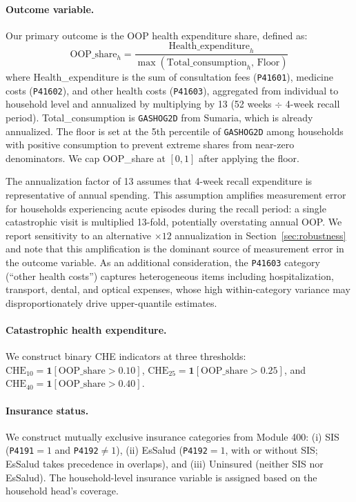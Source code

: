 \paragraph{Outcome variable.} Our primary outcome is the OOP health expenditure share, defined as:
\begin{equation}\label{eq:oop_share}
    \text{OOP\_share}_h = \frac{\text{Health\_expenditure}_h}{\max(\text{Total\_consumption}_h, \, \text{Floor})}
\end{equation}
where Health\_expenditure is the sum of consultation fees (\texttt{P41601}), medicine costs (\texttt{P41602}), and other health costs (\texttt{P41603}), aggregated from individual to household level and annualized by multiplying by 13 (52 weeks $\div$ 4-week recall period). Total\_consumption is \texttt{GASHOG2D} from Sumaria, which is already annualized. The floor is set at the 5th percentile of \texttt{GASHOG2D} among households with positive consumption to prevent extreme shares from near-zero denominators. We cap OOP\_share at $[0, 1]$ after applying the floor.

The annualization factor of 13 assumes that 4-week recall expenditure is representative of annual spending. This assumption amplifies measurement error for households experiencing acute episodes during the recall period: a single catastrophic visit is multiplied 13-fold, potentially overstating annual OOP. We report sensitivity to an alternative $\times 12$ annualization in Section~\ref{sec:robustness} and note that this amplification is the dominant source of measurement error in the outcome variable. As an additional consideration, the \texttt{P41603} category (``other health costs'') captures heterogeneous items including hospitalization, transport, dental, and optical expenses, whose high within-category variance may disproportionately drive upper-quantile estimates.

\paragraph{Catastrophic health expenditure.} We construct binary CHE indicators at three thresholds: $\text{CHE}_{10} = \mathbf{1}[\text{OOP\_share} > 0.10]$, $\text{CHE}_{25} = \mathbf{1}[\text{OOP\_share} > 0.25]$, and $\text{CHE}_{40} = \mathbf{1}[\text{OOP\_share} > 0.40]$.

\paragraph{Insurance status.} We construct mutually exclusive insurance categories from Module 400: (i) SIS (\texttt{P4191}$=1$ and \texttt{P4192}$\neq 1$), (ii) EsSalud (\texttt{P4192}$=1$, with or without SIS; EsSalud takes precedence in overlaps), and (iii) Uninsured (neither SIS nor EsSalud). The household-level insurance variable is assigned based on the household head's coverage.

